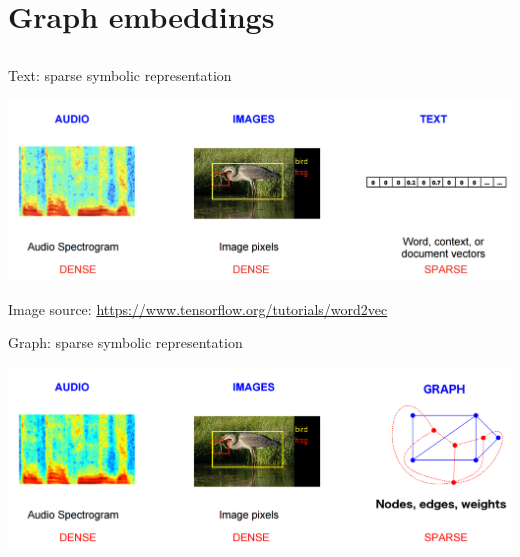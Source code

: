 \section{Graph embeddings}
\subsection{}

\begin{frame}{\alert{Text}: sparse symbolic representation}

\begin{center}
	\includegraphics[width=\textwidth]{figures/w2v}
\end{center}

\pause 

Image source: \url{https://www.tensorflow.org/tutorials/word2vec}
	
\end{frame}




\begin{frame}{\alert{Graph}: sparse symbolic representation}

\begin{center}
	\includegraphics[width=\textwidth]{figures/g2v}
\end{center}
	
\end{frame}


